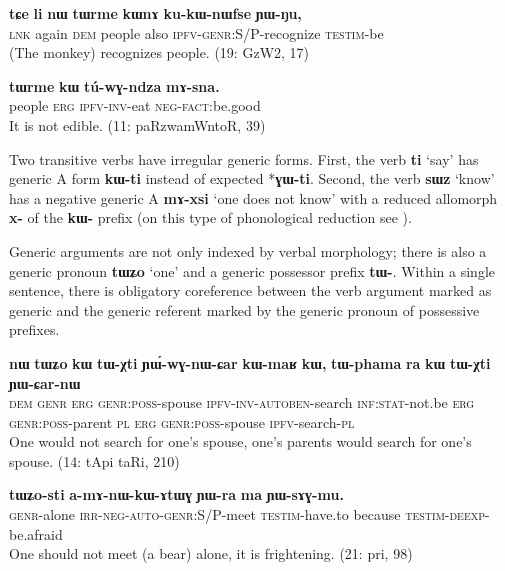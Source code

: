 \documentclass[oneside,a4paper,11pt]{article}
\newcommand{\ipa}[1]{\textbf{\phon\mbox{#1}}} %
\begin{document}
\begin{exe}
\ex \label{ex:kukWnWfse}
\gll
\ipa{tɕe}  	\ipa{li}  	\ipa{nɯ}  	\ipa{tɯrme}  	\ipa{kɯnɤ}  	\ipa{ku-kɯ-nɯfse}  	\ipa{ɲɯ-ŋu,}\\
\textsc{lnk} again \textsc{dem} people also \textsc{ipfv-genr:S/P}-recognize \textsc{testim}-be\\
\glt  (The monkey) recognizes people. (19: GzW2, 17)
\end{exe}

\begin{exe}
\ex  \label{ex:genr.tWrme}
\gll
\ipa{tɯrme} 	\ipa{kɯ} 	\ipa{tú-wɣ-ndza} 	\ipa{mɤ-sna.} \\
people \textsc{erg} \textsc{ipfv-inv}-eat \textsc{neg-fact}:be.good \\
\glt It is not edible. (11: paRzwamWntoR, 39)
\end{exe}

Two transitive verbs have irregular generic forms. First, the verb \ipa{ti} `say' has generic A form \ipa{kɯ-ti} instead of expected *\ipa{ɣɯ-ti}. Second, the verb \ipa{sɯz} `know' has a negative generic A \ipa{mɤ-xsi} `one does not know' with a reduced allomorph \ipa{x-} of the \ipa{kɯ-} prefix (on this type of phonological reduction see \citealt{jacques14antipassive}).

Generic arguments are not only indexed by verbal morphology; there is also a generic pronoun \ipa{tɯʑo} `one' and a generic possessor prefix \ipa{tɯ-}. Within a single sentence, there is obligatory coreference between the verb argument marked as generic and the generic referent marked by the generic pronoun of possessive prefixes.

\begin{exe}
\ex \label{ex:YWwGnWCar}
\gll
\ipa{nɯ} 	\ipa{tɯʑo} 	\ipa{kɯ} 	\ipa{tɯ-χti} 	\ipa{ɲɯ́-wɣ-nɯ-ɕar} 	\ipa{kɯ-maʁ} 	\ipa{kɯ,} 	\ipa{tɯ-phama} 	\ipa{ra} 	\ipa{kɯ} 	\ipa{tɯ-χti} 	\ipa{ɲɯ-ɕar-nɯ} 	\\
\textsc{dem} \textsc{genr} \textsc{erg} \textsc{genr:poss}-spouse \textsc{ipfv-inv-autoben}-search \textsc{inf:stat}-not.be \textsc{erg} \textsc{genr:poss}-parent \textsc{pl} \textsc{erg} \textsc{genr:poss}-spouse \textsc{ipfv}-search-\textsc{pl} \\
\glt One would not search for one's spouse, one's parents would search for one's spouse. (14: tApi taRi, 210)
\end{exe}


\begin{exe}
\ex \label{ex:YWwGnWCar2}
\gll
\ipa{tɯʑo-sti}  	\ipa{a-mɤ-nɯ-kɯ-ɤtɯɣ}  	\ipa{ɲɯ-ra}  	\ipa{ma}  	\ipa{ɲɯ-sɤɣ-mu.}  \\
\textsc{genr}-alone \textsc{irr-neg-auto-genr:S/P}-meet \textsc{testim}-have.to because \textsc{testim-deexp}-be.afraid \\
\glt One should not meet (a bear) alone, it is frightening. (21: pri, 98)
\end{exe}
\end{document}
